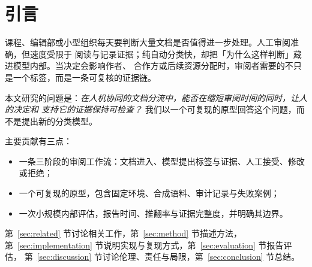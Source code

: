 \section{引言}
\label{sec:introduction}

课程、编辑部或小型组织每天要判断大量文档是否值得进一步处理。人工审阅准确，但速度受限于
阅读与记录证据；纯自动分类快，却把「为什么这样判断」藏进模型内部。当决定会影响作者、
合作方或后续资源分配时，审阅者需要的不只是一个标签，而是一条可复核的证据链。

本文研究的问题是：\emph{在人机协同的文档分流中，能否在缩短审阅时间的同时，让人的决定和
支持它的证据保持可检查？} 我们以一个可复现的原型回答这个问题，而不是提出新的分类模型。

主要贡献有三点：
\begin{itemize}
  \item 一条三阶段的审阅工作流：文档进入、模型提出标签与证据、人工接受、修改或拒绝；
  \item 一个可复现的原型，包含固定环境、合成语料、审计记录与失败案例；
  \item 一次小规模内部评估，报告时间、推翻率与证据完整度，并明确其边界。
\end{itemize}

第~\ref{sec:related} 节讨论相关工作，第~\ref{sec:method} 节描述方法，
第~\ref{sec:implementation} 节说明实现与复现方式，第~\ref{sec:evaluation} 节报告评估，
第~\ref{sec:discussion} 节讨论伦理、责任与局限，第~\ref{sec:conclusion} 节总结。
